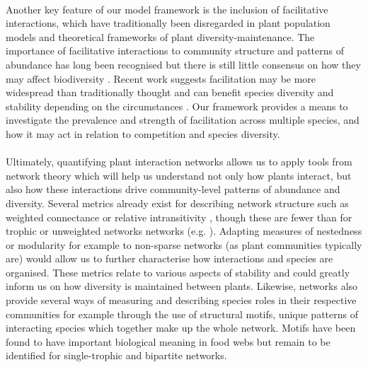 \documentclass[a4,12pt]{article}
\begin{document}
        \paragraph{}
        Another key feature of our model framework is the inclusion of facilitative interactions, which have traditionally been disregarded in plant population models and theoretical frameworks of plant diversity-maintenance. The importance of facilitative interactions to community structure and patterns of abundance has long been recognised \parencite{Callaway1997a} but there is still little consensus on how they may affect biodiversity \parencite{Bruno2003, Brooker2008a}. Recent work suggests facilitation may be more widespread than traditionally thought \parencite{Gross2015, Picoche2020} and can benefit species diversity and stability depending on the circumstances \parencite{Coyte2015, Brooker2008}. Our framework provides a means to investigate the prevalence and strength of facilitation across multiple species, and how it may act in relation to competition and species diversity.  
        
        \paragraph{}
        Ultimately, quantifying plant interaction networks allows us to apply tools from network theory which will help us understand not only how plants interact, but also how these interactions drive community-level patterns of abundance and diversity. Several metrics already exist for describing network structure such as weighted connectance \parencite{Ulanowicz1991} or relative intransitivity \parencite{Laird2006a}, though these are fewer than for trophic or unweighted networks networks (e.g. \cite{Bersier2002, Delmas2019}). Adapting measures of nestedness or modularity for example to non-sparse networks (as plant communities typically are) would allow us to further characterise how interactions and species are organised. These metrics relate to various aspects of stability and could greatly inform us on how diversity is maintained between plants. Likewise, networks also provide several ways of measuring and describing species roles in their respective communities \parencite{Cirtwill2018a} for example through the use of structural motifs, unique patterns of interacting species which together make up the whole network. Motifs have been found to have important biological meaning in food webs \parencite{Bascompte2005a} but remain to be identified for single-trophic and bipartite networks. 
\end{document}
